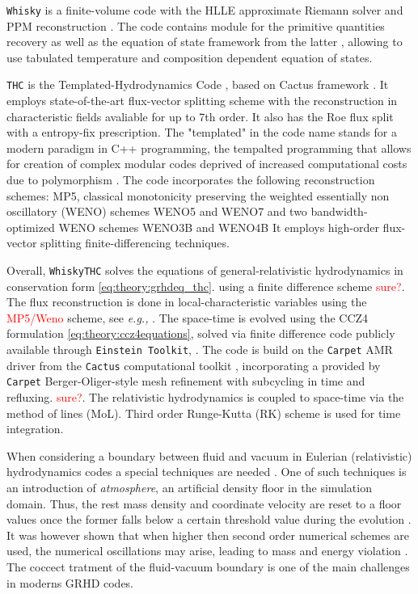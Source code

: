 \documentclass[11pt,a4paper,headinclude=true,DIV=14,BCOR=8mm,chapterprefix,listof=totoc,twoside,openright,abstracton]{scrbook}
\newcommand{\red}[1]{\textcolor{red}{#1}}
\begin{document}
\texttt{Whisky} is a finite-volume code \cite{Baiotti:2010zf,Baiotti:2004wn} with the HLLE approximate Riemann solver \cite{Toro:1999} and PPM reconstruction \cite{Colella:1984}. The code contains module for the primitive quantities recovery as well as the equation of state framework from the latter \cite{Galeazzi:2013mia}, allowing to use tabulated temperature and composition dependent equation of states.


\texttt{THC} is the Templated-Hydrodynamics Code \cite{Radice:2012cu}, based on Cactus framework \cite{Goodale:2003}. It employs state-of-the-art flux-vector splitting scheme with the reconstruction in characteristic fields avaliable for up to 7th order. It also has the Roe flux split with a entropy-fix prescription. The "templated" in the code name stands for a modern paradigm in C++ programming, the tempalted programming that allows for creation of complex modular codes deprived of increased computational costs due to polymorphism \cite{Yang:2001}. The code incorporates the following reconstruction schemes: MP5, classical monotonicity preserving \cite{Suresh:1997,Mignone:2010} the weighted essentially non oscillatory (WENO) schemes WENO5 and WENO7 \cite{Liu:1994,Jiang:1996,Shu:1997} and two bandwidth-optimized WENO schemes WENO3B and WENO4B \cite{Martin:2006,Taylor:2007}
It employs high-order flux-vector splitting finite-differencing techniques.

Overall, \texttt{WhiskyTHC} solves the equations of general-relativistic hydrodynamics in conservation form \ref{eq:theory:grhdeq_thc}. using a finite difference scheme \red{sure?}. The flux reconstruction is done in local-characteristic variables using the \red{MP5/Weno} scheme, see \textit{e.g.,} \cite{Rezzolla:2013}. The space-time is evolved using the CCZ4 formulation \ref{eq:theory:ccz4equations}, solved via finite difference code publicly available through \texttt{Einstein Toolkit}, \cite{McLachlan,Loffler:2011ay}. The code is build on the \texttt{Carpet} AMR driver \cite{Schnetter:2003rb} from the \texttt{Cactus} computational toolkit \cite{Goodale:2003}, incorporating a provided by \texttt{Carpet} Berger-Oliger-style mesh refinement \cite{Berger:1989,Berger:1984} with subcycling in time and refluxing. \red{sure?}. The relativistic hydrodynamics is coupled to space-time via the method of lines (MoL). Third order Runge-Kutta (RK) scheme is used for time integration. 

When considering a boundary between fluid and vacuum in Eulerian (relativistic) hydrodynamics codes a special techniques are needed \cite{Galeazzi:mThesis:2008,Kastaun:2006,Millmore:2009dk}. One of such techniques is an introduction of \textit{atmosphere}, an artificial density floor in the simulation domain. Thus, the rest mass density and coordinate velocity are reset to a floor values once the former falls below a certain threshold value during the evolution \cite{Font:2001ew,Baiotti:2004wn}. It was however shown that when higher then second order numerical schemes are used, the numerical oscillations may arise, leading to mass and energy violation \cite{Radice:2011qr}. The coccect tratment of the fluid-vacuum boundary is one of the main challenges in moderns GRHD codes. 
\end{document}
